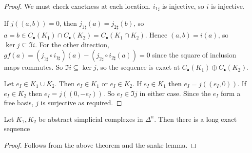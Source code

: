 \begin{proof}
	We must check exactness at each location.
	\( i_{1\sharp} \) is injective, so \( i \) is injective.

	If \( j((a, b)) = 0 \), then \( j_{1\sharp}(a) = j_{2\sharp}(b) \), so \( a = b \in C_\bullet(K_1) \cap C_\bullet(K_2) = C_\bullet(K_1 \cap K_2) \).
	Hence \( (a, b) = i(a) \), so \( \ker j \subseteq \Im i \).
	For the other direction, \( gf(a) = (j_{1\sharp} \circ i_{1\sharp})(a) - (j_{2\sharp} \circ i_{2\sharp}(a)) = 0 \) since the square of inclusion maps commutes.
	So \( \Im i \subseteq \ker j \), so the sequence is exact at \( C_\bullet(K_1) \oplus C_\bullet(K_2) \).

	Let \( e_I \in K_1 \cup K_2 \).
	Then \( e_I \in K_1 \) or \( e_I \in K_2 \).
	If \( e_I \in K_1 \) then \( e_I = j((e_I, 0)) \).
	If \( e_I \in K_2 \) then \( e_I = j((0, -e_I)) \).
	So \( e_I \in \Im j \) in either case.
	Since the \( e_I \) form a free basis, \( j \) is surjective as required.
\end{proof}
\begin{theorem}
	Let \( K_1, K_2 \) be abstract simplicial complexes in \( \Delta^n \).
	Then there is a long exact sequence
	\begin{center}
	\end{center}
\end{theorem}
\begin{proof}
	Follows from the above theorem and the snake lemma.
\end{proof}
